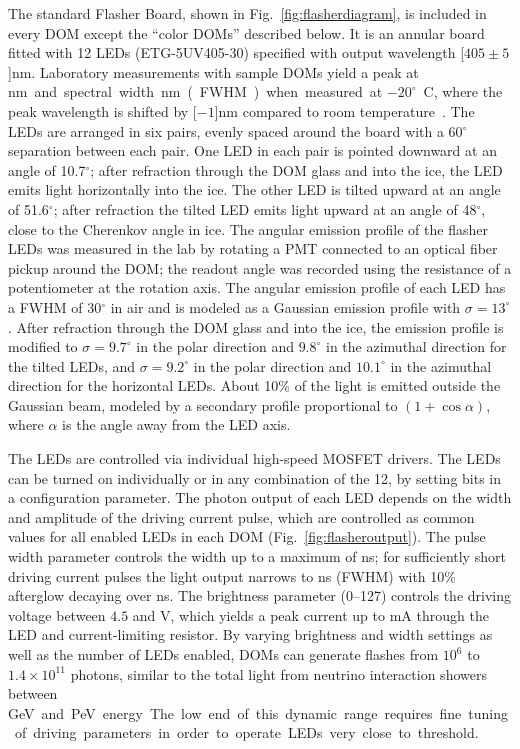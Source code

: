 The standard Flasher Board, shown in Fig.~\ref{fig:flasherdiagram}, is
included in every DOM except the ``color DOMs''
described below. It is an annular board fitted with 12 LEDs (ETG-5UV405-30)
specified with output wavelength \unit[$405\pm5$]nm.  Laboratory
measurements with sample DOMs yield a peak at
\unit[399]nm and spectral width \unit[14]nm (FWHM) when measured at
$-20^{\circ}$~C, where the peak wavelength is shifted by 
\unit[$-1$]nm compared to room temperature~\cite{Aartsen:2013rt}.
The LEDs are arranged in six pairs, evenly spaced around the board
with a 60$^{\circ}$ separation between each pair. One LED in each pair
is pointed downward at an angle of 10.7$^{\circ}$; after refraction through the DOM glass and into
the ice, the LED
emits light horizontally into the ice. The other LED is tilted upward
at an angle of 51.6$^{\circ}$; after refraction the tilted LED
emits light upward at an angle 
of 48$^{\circ}$, close to the Cherenkov angle in ice. The angular
emission profile of the flasher LEDs was measured in the lab by
rotating a PMT connected to an
optical fiber pickup around the DOM; the readout angle was recorded
using the resistance of a potentiometer at the rotation axis.
The angular emission profile of each LED has a FWHM of
30$^{\circ}$ in air and is modeled as a Gaussian emission profile
with $\sigma = 13^{\circ}$. After refraction through the DOM glass and into
the ice, the emission profile is modified to $\sigma = 9.7^{\circ}$ in the polar direction
and $9.8^{\circ}$ in the azimuthal direction for the tilted LEDs, and $\sigma=9.2^{\circ}$ in the polar direction
and $10.1^{\circ}$ in the azimuthal direction for the horizontal LEDs.
About 10\% of the light is emitted outside the Gaussian beam, modeled by
a secondary profile proportional to $(1+\cos{\alpha})$, where $\alpha$ is the angle
away from the LED axis.

The LEDs are controlled via individual high-speed MOSFET drivers. The LEDs can be turned on individually or in any
combination of the 12, by setting bits in a configuration parameter.
The photon output of each LED depends on the width and
amplitude of the driving current pulse, which are controlled as common
values for all enabled LEDs in each DOM (Fig.~\ref{fig:flasheroutput}).  
The pulse width parameter controls the width up to a maximum of \unit[70]{ns}; 
for sufficiently short driving current pulses the light output narrows to \unit[6]{ns} (FWHM) with
10\% afterglow decaying over \unit[15--20]{ns}. The brightness parameter (0--127) controls the driving voltage between
$4.5$ and \unit[15]{V}, which yields a peak current up to
\unit[300]{mA} through the LED and current-limiting resistor.
By varying brightness and width settings as well as the number of LEDs enabled, DOMs can generate flashes
from $10^6$ to $1.4\times10^{11}$ photons, similar to the total light from
neutrino interaction showers between \unit[7]GeV and \unit[1]PeV energy.
The low end of this dynamic range requires fine tuning of driving
parameters in order to operate LEDs very close to threshold.

